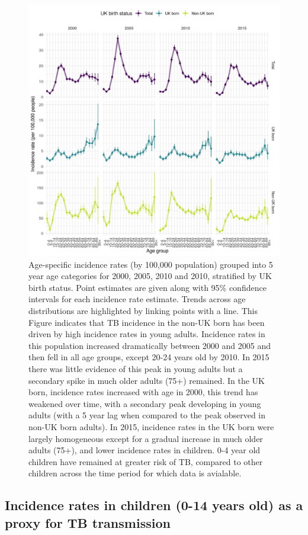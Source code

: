 \documentclass[11pt,twoside]{bristolthesis}
\begin{document}
  \newpage
  \begin{figure}
  
  {\centering \includegraphics[width=0.8\linewidth,]{chapters/tb-epi-england/figures/plot-age-dist-inc-rates} 
  
  }
  
  \caption[Age-specific incidence rates (by 100,000 population) grouped into 5 year age categories for 2000, 2005, 2010 and 2010, stratified by UK birth status.]{Age-specific incidence rates (by 100,000 population) grouped into 5 year age categories for 2000, 2005, 2010 and 2010, stratified by UK birth status. Point estimates are given along with 95\% confidence intervals for each incidence rate estimate. Trends across age distributions are highlighted by linking points with a line. This Figure indicates that TB incidence in the non-UK born has been driven by high incidence rates in young adults. Incidence rates in this population increased dramatically between 2000 and 2005 and then fell in all age groups, except 20-24 years old by 2010. In 2015 there was little evidence of this peak in young adults but a secondary spike in much older adults (75+) remained. In the UK born, incidence rates increased with age in 2000, this trend has weakened over time, with a secondary peak developing in young adults (with a 5 year lag when compared to the peak observed in non-UK born adults). In 2015, incidence rates in the UK born were largely homogeneous except for a gradual increase in much older adults (75+), and lower incidence rates in children. 0-4 year old children have remained at greater risk of TB, compared to other children across the time period for which data is avialable.}\label{fig:plot-age-dist-inc-rates}
  \end{figure}
  \hypertarget{incidence-rates-in-children-0-14-years-old-as-a-proxy-for-tb-transmission}{%
  \subsection{Incidence rates in children (0-14 years old) as a proxy for TB transmission}\label{incidence-rates-in-children-0-14-years-old-as-a-proxy-for-tb-transmission}}
  
\end{document}
